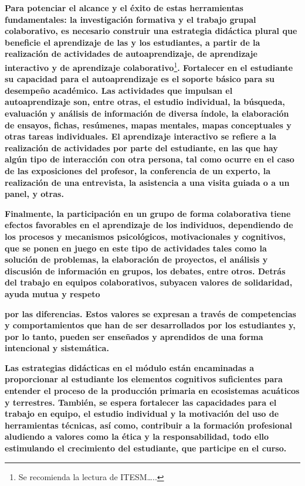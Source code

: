 \documentclass[
]{article}
\begin{document}
\textbf{Para potenciar el alcance y el éxito de estas herramientas
fundamentales: la investigación formativa y el trabajo grupal
colaborativo, es necesario construir una estrategia didáctica plural que
beneficie el aprendizaje de las y los estudiantes, a partir de la
realización de actividades de autoaprendizaje, de aprendizaje
interactivo y de aprendizaje colaborativo}\footnote{Se recomienda la
  lectura de ITESM\ldots..}\textbf{. Fortalecer en el estudiante su
capacidad para el autoaprendizaje es el soporte básico para su desempeño
académico. Las actividades que impulsan el autoaprendizaje son, entre
otras, el estudio individual, la búsqueda, evaluación y análisis de
información de diversa índole, la elaboración de ensayos, fichas,
resúmenes, mapas mentales, mapas conceptuales y otras tareas
individuales. El aprendizaje interactivo se refiere a la realización de
actividades por parte del estudiante, en las que hay algún tipo de
interacción con otra persona, tal como ocurre en el caso de las
exposiciones del profesor, la conferencia de un experto, la realización
de una entrevista, la asistencia a una visita guiada o a un panel, y
otras.}

\textbf{Finalmente, la participación en un grupo de forma colaborativa
tiene efectos favorables en el aprendizaje de los individuos,
dependiendo de los procesos y mecanismos psicológicos, motivacionales y
cognitivos, que se ponen en juego en este tipo de actividades tales como
la solución de problemas, la elaboración de proyectos, el análisis y
discusión de información en grupos, los debates, entre otros. Detrás del
trabajo en equipos colaborativos, subyacen valores de solidaridad, ayuda
mutua y respeto}

\textbf{por las diferencias. Estos valores se expresan a través de
competencias y comportamientos que han de ser desarrollados por los
estudiantes y, por lo tanto, pueden ser enseñados y aprendidos de una
forma intencional y sistemática.}

\textbf{Las estrategias didácticas en el módulo están encaminadas a
proporcionar al estudiante los elementos cognitivos suficientes para
entender el proceso de la producción primaria en ecosistemas acuáticos y
terrestres. También, se espera fortalecer las capacidades para el
trabajo en equipo, el estudio individual y la motivación del uso de
herramientas técnicas, así como, contribuir a la formación profesional
aludiendo a valores como la ética y la responsabilidad, todo ello
estimulando el crecimiento del estudiante, que participe en el curso.}
\end{document}

